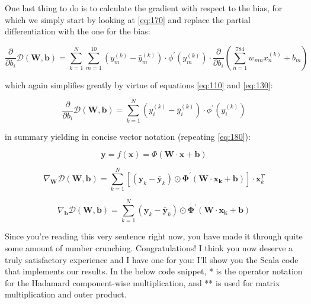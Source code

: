 \documentclass[]{report}
\begin{document}
One last thing to do is to calculate the gradient with respect to the bias, for which we simply start by looking at \ref{eq:170} and replace the partial differentiation with the one for the bias:

\begin{equation}\label{eq:210}
\frac{\partial}{\partial b_{i}}\mathcal{D}(\mathbf{W}, \mathbf{b})
= \sum_{k=1}^N \sum_{m=1}^{10}
(y_m^{(k)} - \bar{y}_m^{(k)})
\cdot
\phi^{\prime}(y_m^{(k)}) \cdot
\frac{\partial}{\partial b_{i}}(\sum_{n=1}^{784} w_{mn} x^{(k)}_n + b_m)
\end{equation}

which again simplifies greatly by virtue of equations \ref{eq:110} and \ref{eq:130}:

\begin{equation}\label{eq:220}
\frac{\partial}{\partial b_{i}}\mathcal{D}(\mathbf{W}, \mathbf{b})
= \sum_{k=1}^N
(y_i^{(k)} - \bar{y}_i^{(k)})
\cdot
\phi^{\prime}(y_i^{(k)})
\end{equation}

in summary yielding in concise vector notation (repeating \ref{eq:180}):

\begin{equation}
\mathbf{y} = f(\mathbf{x})=\Phi(\mathbf{W} \cdot \mathbf{x} + \mathbf{b})
\end{equation}

\begin{equation}
\nabla_{\mathbf{W}} \mathcal{D}(\mathbf{W}, \mathbf{b})=
\sum_{k=1}^N \left[ ( \mathbf{y}_k - \bar{\mathbf{y}}_k    )  \odot \mathbf{\Phi^{\prime}}(\mathbf{W} \cdot \mathbf{x_k} + \mathbf{b}) \right]
\cdot \mathbf{x}_k^T
\end{equation}

\begin{equation}
\nabla_{\mathbf{b}} \mathcal{D}(\mathbf{W}, \mathbf{b})=
\sum_{k=1}^N  ( \mathbf{y}_k - \bar{\mathbf{y}}_k    )  \odot \mathbf{\Phi^{\prime}}(\mathbf{W} \cdot \mathbf{x_k} + \mathbf{b})
\end{equation}

Since you're reading this very sentence right now, you have made it through quite some amount of number crunching. Congratulations! I think you now deserve a truly satisfactory experience and I have one for you: I'll show you the Scala code that implements our results. In the below code snippet, * is the operator notation for the Hadamard component-wise multiplication, and ** is used for matrix multiplication and outer product.
\end{document}
